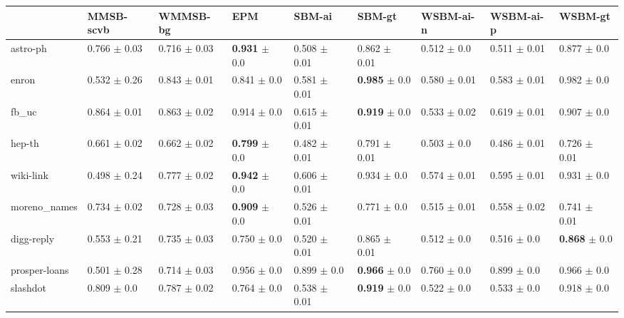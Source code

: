 \begin{tabular}{lllllllll}
\hline
               & MMSB-scvb          & WMMSB-bg        & EPM                      & SBM-ai           & SBM-gt                    & WSBM-ai-n        & WSBM-ai-p        & WSBM-gt                  \\ 
\hline
 astro-ph      & 0.766 $\pm$ 0.03 & 0.716 $\pm$ 0.03 & \textbf{0.931} $\pm$ 0.0 & 0.508 $\pm$ 0.01 & 0.862 $\pm$ 0.01          & 0.512 $\pm$ 0.0  & 0.511 $\pm$ 0.01 & 0.877 $\pm$ 0.0 \\
 enron         & 0.532 $\pm$ 0.26 & 0.843 $\pm$ 0.01 & 0.841 $\pm$ 0.0          & 0.581 $\pm$ 0.01 & \textbf{0.985} $\pm$ 0.0  & 0.580 $\pm$ 0.01 & 0.583 $\pm$ 0.01 & 0.982 $\pm$ 0.0          \\
 fb\_uc        & 0.864 $\pm$ 0.01 & 0.863 $\pm$ 0.02 & 0.914 $\pm$ 0.0          & 0.615 $\pm$ 0.01 & \textbf{0.919} $\pm$ 0.0  & 0.533 $\pm$ 0.02 & 0.619 $\pm$ 0.01 & 0.907 $\pm$ 0.0          \\
 hep-th        & 0.661 $\pm$ 0.02 & 0.662 $\pm$ 0.02 & \textbf{0.799} $\pm$ 0.0 & 0.482 $\pm$ 0.01 & 0.791 $\pm$ 0.01          & 0.503 $\pm$ 0.0  & 0.486 $\pm$ 0.01 & 0.726 $\pm$ 0.01         \\
 wiki-link     & 0.498 $\pm$ 0.24 & 0.777 $\pm$ 0.02 & \textbf{0.942} $\pm$ 0.0 & 0.606 $\pm$ 0.01 & 0.934          $\pm$ 0.0  & 0.574 $\pm$ 0.01 & 0.595 $\pm$ 0.01 & 0.931 $\pm$ 0.0          \\
 moreno\_names & 0.734 $\pm$ 0.02 & 0.728 $\pm$ 0.03 & \textbf{0.909} $\pm$ 0.0 & 0.526 $\pm$ 0.01 & 0.771          $\pm$ 0.0  & 0.515 $\pm$ 0.01 & 0.558 $\pm$ 0.02 & 0.741 $\pm$ 0.01         \\
 digg-reply    & 0.553 $\pm$ 0.21 & 0.735 $\pm$ 0.03 & 0.750 $\pm$ 0.0          & 0.520 $\pm$ 0.01 & 0.865          $\pm$ 0.01 & 0.512 $\pm$ 0.0  & 0.516 $\pm$ 0.0  & \textbf{0.868} $\pm$ 0.0 \\
 prosper-loans & 0.501 $\pm$ 0.28 & 0.714 $\pm$ 0.03 & 0.956 $\pm$ 0.0          & 0.899 $\pm$ 0.0  & \textbf{0.966} $\pm$ 0.0  & 0.760 $\pm$ 0.0  & 0.899 $\pm$ 0.0  & 0.966 $\pm$ 0.0          \\
 slashdot      & 0.809 $\pm$ 0.0  & 0.787 $\pm$ 0.02 & 0.764 $\pm$ 0.0          & 0.538 $\pm$ 0.01 & \textbf{0.919} $\pm$ 0.0  & 0.522 $\pm$ 0.0  & 0.533 $\pm$ 0.0  & 0.918 $\pm$ 0.0          \\
\hline
\end{tabular}

